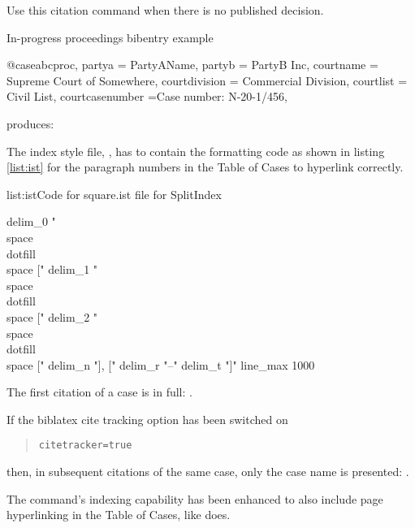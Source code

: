 \p Use this citation command when there is no published decision.

\begin{dov}{ex}{In-progress proceedings bibentry example}

@case{abcproc,
  partya = {PartyAName},
  partyb = {PartyB Inc},
  courtname = {Supreme Court of Somewhere},
  courtdivision = {Commercial Division},
  courtlist = {Civil List},
  courtcasenumber ={Case number: N-20-1/456},
}

\end{dov}
\newpage 

\p {} produces: 

\bigskip

\p The index style file, , has to contain the formatting code as shown in listing \ref{list:ist} for the paragraph numbers in the Table of Cases to hyperlink correctly.


\begin{dov}{list:ist}{Code for square.ist file for SplitIndex}

delim_0 "\\space\\dotfill\\space ["
delim_1 "\\space\\dotfill\\space ["
delim_2 "\\space\\dotfill\\space ["
delim_n "], ["
delim_r "--"
delim_t "]"
line_max 1000

\end{dov}
\newpage

\p The first citation of a case is in full: .

\p If the biblatex cite tracking option has been switched on 
\begin{quotation}
\hspace{2em}\verb|citetracker=true|
\end{quotation}
 then, in subsequent citations of the same case, only the case name is presented: .

\p The  command's indexing capability has been enhanced to also include page hyperlinking in the Table of Cases, like  does.

